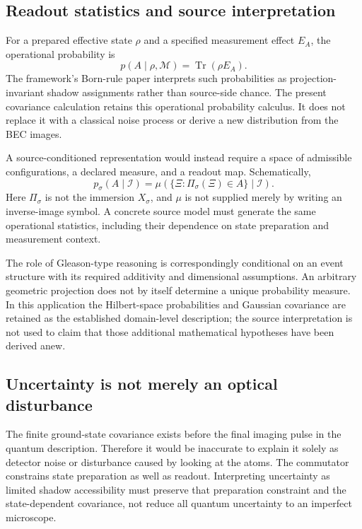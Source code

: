\documentclass[11pt,a4paper]{article}
\theoremstyle{definition}
\theoremstyle{remark}
\newcommand{\Tr}{\operatorname{Tr}}
\begin{document}
\subsection{Readout statistics and source interpretation}
For a prepared effective state $\rho$ and a specified measurement effect $E_A$, the operational probability is
\begin{equation}
 p(A\mid\rho,\mathcal M)=\Tr(\rho E_A).
 \label{eq:born_effect}
\end{equation}
The framework's Born-rule paper interprets such probabilities as projection-invariant shadow assignments rather than source-side chance. The present covariance calculation retains this operational probability calculus. It does not replace it with a classical noise process or derive a new distribution from the BEC images.\cite{born,foundation}

A source-conditioned representation would instead require a space of admissible configurations, a declared measure, and a readout map. Schematically,
\begin{equation}
 p_\sigma(A\mid\mathcal I)
 =\mu\!\left(\{\Xi:\Pi_\sigma(\Xi)\in A\}\mid\mathcal I\right).
 \label{eq:pushforward}
\end{equation}
Here $\Pi_\sigma$ is not the immersion $X_\sigma$, and $\mu$ is not supplied merely by writing an inverse-image symbol. A concrete source model must generate the same operational statistics, including their dependence on state preparation and measurement context.\cite{born,foundation}

The role of Gleason-type reasoning is correspondingly conditional on an event structure with its required additivity and dimensional assumptions. An arbitrary geometric projection does not by itself determine a unique probability measure. In this application the Hilbert-space probabilities and Gaussian covariance are retained as the established domain-level description; the source interpretation is not used to claim that those additional mathematical hypotheses have been derived anew.\cite{born}

\subsection{Uncertainty is not merely an optical disturbance}
The finite ground-state covariance exists before the final imaging pulse in the quantum description. Therefore it would be inaccurate to explain it solely as detector noise or disturbance caused by looking at the atoms. The commutator constrains state preparation as well as readout. Interpreting uncertainty as limited shadow accessibility must preserve that preparation constraint and the state-dependent covariance, not reduce all quantum uncertainty to an imperfect microscope.\cite{zhang2026,weedbrook,born}
\end{document}
